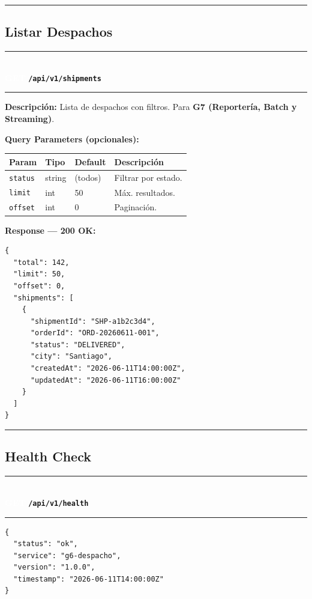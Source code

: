 \documentclass[11pt, a4paper]{article}
\newcommand{\httpmethod}[2]{%
  \colorbox{#1}{\textcolor{white}{\textbf{\small\textsf{#2}}}}%
}
\newcommand{\routeheader}[3]{%
  \noindent\rule{\textwidth}{1.5pt}\\[0.3em]
  \httpmethod{#1}{#2}\;\texttt{\bfseries #3}\\[0.3em]
  \rule{\textwidth}{0.4pt}
  \vspace{0.3cm}
}
\begin{document}
\noindent\rule{\textwidth}{0.4pt}

\subsection{Listar Despachos}

\routeheader{get}{GET}{/api/v1/shipments}

\textbf{Descripción:} Lista de despachos con filtros. Para \textbf{G7 (Reportería, Batch y Streaming)}.

\vspace{0.3cm}
\textbf{Query Parameters (opcionales):}
\begin{table}[h!]
\small
\begin{tabularx}{\textwidth}{l l l X}
  \toprule
  \textbf{Param} & \textbf{Tipo} & \textbf{Default} & \textbf{Descripción} \\
  \midrule
  \texttt{status} & string & (todos) & Filtrar por estado. \\
  \texttt{limit}  & int    & 50      & Máx. resultados. \\
  \texttt{offset} & int    & 0       & Paginación. \\
  \bottomrule
\end{tabularx}
\end{table}

\textbf{Response --- 200 OK:}

\begin{lstlisting}
{
  "total": 142,
  "limit": 50,
  "offset": 0,
  "shipments": [
    {
      "shipmentId": "SHP-a1b2c3d4",
      "orderId": "ORD-20260611-001",
      "status": "DELIVERED",
      "city": "Santiago",
      "createdAt": "2026-06-11T14:00:00Z",
      "updatedAt": "2026-06-11T16:00:00Z"
    }
  ]
}
\end{lstlisting}

\noindent\rule{\textwidth}{0.4pt}

\subsection{Health Check}

\routeheader{get}{GET}{/api/v1/health}

\begin{lstlisting}
{
  "status": "ok",
  "service": "g6-despacho",
  "version": "1.0.0",
  "timestamp": "2026-06-11T14:00:00Z"
}
\end{lstlisting}
\end{document}
